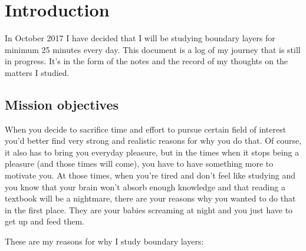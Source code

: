 \documentclass[12pt]{report}
\begin{document}

\setlength{\parindent}{0cm}

\clearpage


\tableofcontents



\setlength{\parskip}{1em}
\renewcommand{\baselinestretch}{1.0}


\newpage


\chapter{Introduction} \label{chap:intro}

In October 2017 I have decided that I will be studying boundary layers for minimum 25 minutes every day. This document is a log of my journey that is still in progress. It's in the form of the notes and the record of my thoughts on the matters I studied.


\section{Mission objectives} \label{chap:objectives}

When you decide to sacrifice time and effort to pursue certain field of interest you'd better find very strong and realistic reasons for why you do that. Of course, it also has to bring you everyday pleasure, but in the times when it stops being a pleasure (and those times will come), you have to have something more to motivate you. At those times, when you're tired and don't feel like studying and you know that your brain won't absorb enough knowledge and that reading a textbook will be a nightmare, there are your reasons why you wanted to do that in the first place. They are your babies screaming at night and you just have to get up and feed them.

These are my reasons for why I study boundary layers:
\end{document}
